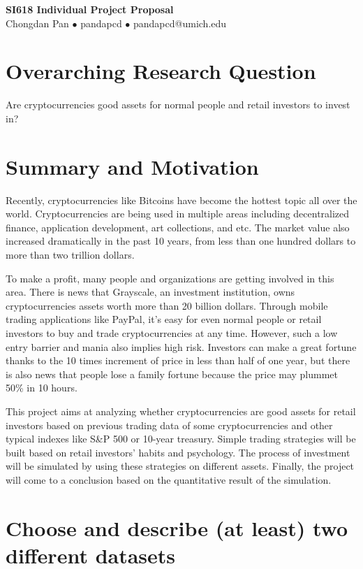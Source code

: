 \documentclass[a4paper]{article}
\begin{document}
\begin{center}
    \Large{\textbf{SI618 Individual Project Proposal}}\\
    \large{Chongdan Pan $\bullet$ pandapcd $\bullet$ pandapcd@umich.edu}
\end{center}
\section{Overarching Research Question}
Are cryptocurrencies good assets for normal people and retail investors to invest in?
\section{Summary and Motivation}
Recently, cryptocurrencies like Bitcoins have become the hottest topic all over the world. Cryptocurrencies are being used in multiple areas including decentralized finance, application development, art collections, and etc. The market value also increased dramatically in the past 10 years, from less than one hundred dollars to more than two trillion dollars.

\par To make a profit, many people and organizations are getting involved in this area. There is news that Grayscale, an investment institution, owns cryptocurrencies assets worth more than 20 billion dollars. Through mobile trading applications like PayPal, it's easy for even normal people or retail investors to buy and trade cryptocurrencies at any time. However, such a low entry barrier and mania also implies high risk. Investors can make a great fortune thanks to the 10 times increment of price in less than half of one year, but there is also news that people lose a family fortune because the price may plummet 50\% in 10 hours.

\par This project aims at analyzing whether cryptocurrencies are good assets for retail investors based on previous trading data of some cryptocurrencies and other typical indexes like S\&P 500 or 10-year treasury. Simple trading strategies will be built based on retail investors' habits and psychology. The process of investment will be simulated by using these strategies on different assets. Finally, the project will come to a conclusion based on the quantitative result of the simulation.


\section{Choose and describe (at least) two different datasets}
\end{document}
